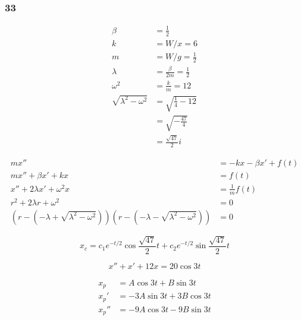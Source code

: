 \documentclass{article}
\begin{document}
\subsubsection{33}

\begin{align*}
  \beta                       & = \frac{1}{2}                     \\
  k                           & = W / x = 6                       \\
  m                           & = W / g = \frac{1}{2}             \\
  \lambda                     & = \frac{\beta}{2 m} = \frac{1}{2} \\
  \omega^2                    & = \frac{k}{m} = 12                \\
  \sqrt{\lambda^2 - \omega^2} & = \sqrt{\frac{1}{4} - 12}         \\
                              & = \sqrt{-\frac{47}{4}}            \\
                              & = \frac{\sqrt{47}}{2} i
\end{align*}

\begin{align*}
  m x''                                                                                         & = -k x - \beta x' + f(t) \\
  m x'' + \beta x' + k x                                                                        & = f(t)                   \\
  x'' + 2 \lambda x' + \omega^2 x                                                               & = \frac{1}{m} f(t)       \\
  r^2 + 2 \lambda r + \omega^2                                                                  & = 0                      \\
  (r - (-\lambda + \sqrt{\lambda^2 - \omega^2})) (r - (-\lambda - \sqrt{\lambda^2 - \omega^2})) & = 0
\end{align*}

\[x_c = c_1 e^{-t / 2} \cos \frac{\sqrt{47}}{2} t + c_2 e^{-t / 2} \sin \frac{\sqrt{47}}{2} t\]

\[x'' + x' + 12x = 20 \cos 3t\]

\begin{align*}
  x_p   & = A \cos 3t + B \sin 3t      \\
  x_p'  & = -3 A \sin 3t + 3 B \cos 3t \\
  x_p'' & = -9 A \cos 3t - 9 B \sin 3t
\end{align*}
\end{document}

